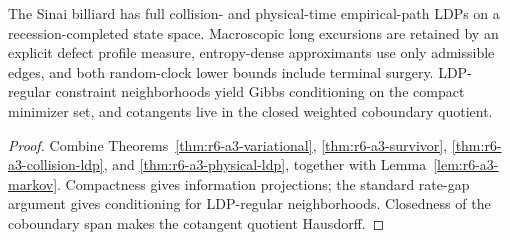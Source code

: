 \begin{theorem}
\label{thm:r6-a3-main}
The Sinai billiard has full collision- and physical-time empirical-path LDPs
on a recession-completed state space.  Macroscopic long excursions are
retained by an explicit defect profile measure, entropy-dense approximants use
only admissible edges, and both random-clock lower bounds include terminal
surgery.  LDP-regular constraint neighborhoods yield Gibbs conditioning on
the compact minimizer set, and cotangents live in the closed weighted
coboundary quotient.
\end{theorem}

\begin{proof}
Combine Theorems~\ref{thm:r6-a3-variational},
\ref{thm:r6-a3-survivor}, \ref{thm:r6-a3-collision-ldp}, and
\ref{thm:r6-a3-physical-ldp}, together with
Lemma~\ref{lem:r6-a3-markov}.  Compactness gives information projections; the
standard rate-gap argument gives conditioning for LDP-regular neighborhoods.
Closedness of the coboundary span makes the cotangent quotient Hausdorff.
\end{proof}
